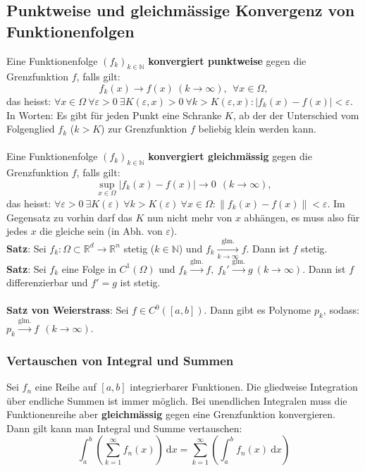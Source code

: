 \documentclass[a4paper,10pt]{scrartcl}
\newcommand{\diff}{\ \mathrm{d}}
\begin{document}
\subsection{Punktweise und gleichmässige Konvergenz von Funktionenfolgen}
Eine Funktionenfolge $(f_k)_{k\in\mathbb{N}}$ \textbf{konvergiert punktweise} gegen die Grenzfunktion $f$, falls gilt: 
\begin{equation}
	f_k(x)\to f(x) \ (k\to \infty), \ \ \forall x\in \Omega, 
\end{equation}
das heisst: $\forall x\in\Omega\ \forall \varepsilon >0\ \exists K(\varepsilon,x)>0\ \forall k>K(\varepsilon,x): |f_k(x)-f(x)|<\varepsilon$. In Worten: Es gibt für jeden Punkt eine Schranke $K$, ab der der Unterschied vom Folgenglied $f_k$ ($k>K$) zur Grenzfunktion $f$ beliebig klein werden kann.\\\\
Eine Funktionenfolge $(f_k)_{k\in\mathbb{N}}$ \textbf{konvergiert gleichmässig} gegen die Grenzfunktion $f$, falls gilt: 
\begin{equation}
	\sup_{x\in\Omega} |f_k(x)-f(x)| \to 0 \ \ (k\to \infty),
\end{equation}
das heisst: $\forall \varepsilon >0 \ \exists K(\varepsilon) \ \forall k>K(\varepsilon)\ \forall x\in\Omega: \|f_k(x)-f(x)\|<\varepsilon$. Im Gegensatz zu vorhin darf das $K$ nun nicht mehr von $x$ abhängen, es muss also für jedes $x$ die gleiche sein (in Abh. von $\varepsilon$).\\
\textbf{Satz}: Sei $f_k:\Omega\subset \mathbb{R}^d\to \mathbb{R}^n$ stetig ($k\in \mathbb{N}$) und $f_k\underset{k\to\infty}{\overset{\text{glm.}}{\to}} f$. Dann ist $f$ stetig.\\
\textbf{Satz}: Sei $f_k$ eine Folge in $C^1(\Omega)$ und  $f_k\overset{\text{glm.}}{\to} f, \ f_k' \overset{\text{glm.}}{\to} g \ (k\to \infty)$. Dann ist $f$ differenzierbar und $f'=g$ ist stetig. \\\\
\textbf{Satz von Weierstrass}: Sei $f\in C^0([a,b])$. Dann gibt es Polynome $p_k$, sodass: $p_k\overset{\text{glm.}}{\to} f \ \ (k\to \infty)$.
\subsubsection{Vertauschen von Integral und Summen}
Sei $f_n$ eine Reihe auf $[a,b]$ integrierbarer Funktionen. Die gliedweise Integration über endliche Summen ist immer möglich. Bei unendlichen Integralen muss die Funktionenreihe aber \textbf{gleichmässig} gegen eine Grenzfunktion konvergieren. Dann gilt kann man Integral und Summe vertauschen: 
\begin{equation}
	\int_{a}^{b}\left( \sum_{k=1}^{\infty} f_n (x) \right)\diff x = 
	\sum_{k=1}^{\infty} \left( \int_{a}^{b} f_n(x) \diff x \right)
\end{equation}
\end{document}
